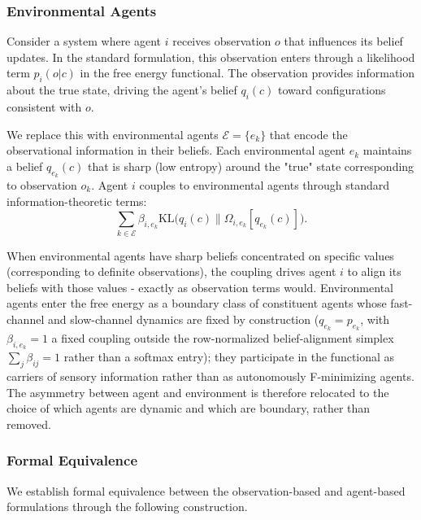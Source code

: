 \documentclass[11pt]{article}
\begin{document}
\subsubsection{Environmental Agents}

Consider a system where agent $i$ receives observation $o$ that influences its belief updates. In the standard formulation, this observation enters through a likelihood term $p_i(o|c)$ in the free energy functional. The observation provides information about the true state, driving the agent's belief $q_i(c)$ toward configurations consistent with $o$.

We replace this with environmental agents $\mathcal{E} = \{e_k\}$ that encode the observational information in their beliefs. Each environmental agent $e_k$ maintains a belief $q_{e_k}(c)$ that is sharp (low entropy) around the "true" state corresponding to observation $o_k$. Agent $i$ couples to environmental agents through standard information-theoretic terms:
\begin{equation}
\sum_{k \in \mathcal{E}} \beta_{i,e_k}  \mathrm{KL}\big(q_i(c) \| \Omega_{i,e_k}[q_{e_k}(c)]\big).
\end{equation}

When environmental agents have sharp beliefs concentrated on specific values (corresponding to definite observations), the coupling drives agent $i$ to align its beliefs with those values - exactly as observation terms would. Environmental agents enter the free energy as a boundary class of constituent agents whose fast-channel and slow-channel dynamics are fixed by construction ($q_{e_k} = p_{e_k}$, with $\beta_{i,e_k} = 1$ a fixed coupling outside the row-normalized belief-alignment simplex $\sum_j \beta_{ij} = 1$ rather than a softmax entry); they participate in the functional as carriers of sensory information rather than as autonomously F-minimizing agents. The asymmetry between agent and environment is therefore relocated to the choice of which agents are dynamic and which are boundary, rather than removed.

\subsubsection{Formal Equivalence}

We establish formal equivalence between the observation-based and agent-based formulations through the following construction.
\end{document}
